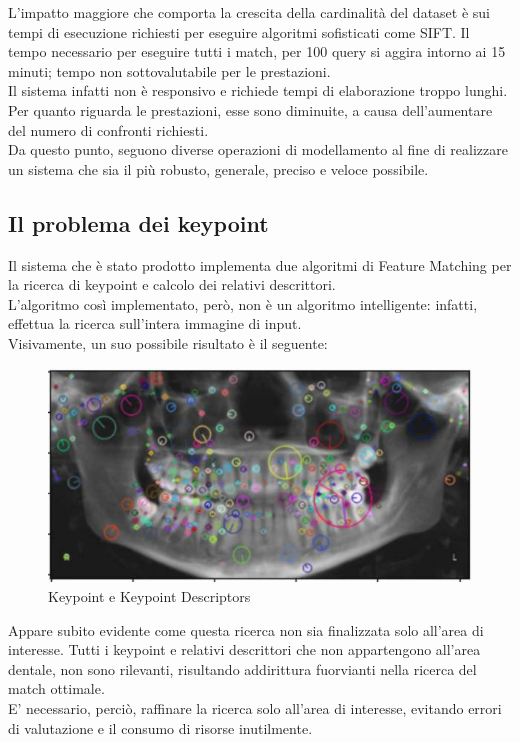 \documentclass[12pt,a4paper,openright,twoside]{book}
\begin{document}
L'impatto maggiore che comporta la crescita della cardinalità del dataset è sui tempi di esecuzione richiesti per eseguire algoritmi sofisticati come SIFT. Il tempo necessario per eseguire tutti i match, per 100 query si aggira intorno ai 15 minuti; tempo non sottovalutabile per  le prestazioni.\\
Il sistema infatti non è responsivo e richiede tempi di elaborazione troppo lunghi.\\

Per quanto riguarda le prestazioni, esse sono diminuite,  a causa dell'aumentare del numero di confronti richiesti.\\
Da questo punto, seguono diverse operazioni di modellamento al fine di realizzare un sistema che sia il più robusto, generale, preciso e veloce possibile.



\subsection{Il problema dei keypoint}
Il sistema che è stato prodotto implementa due algoritmi di Feature Matching per la ricerca di keypoint e calcolo dei relativi descrittori. \\
L'algoritmo così implementato, però, non è un algoritmo intelligente: infatti, effettua la ricerca sull'intera immagine di input.\\

Visivamente, un suo possibile risultato è il seguente:
\begin{figure}[H]
	\centering
	\includegraphics[width=14cm]{figures/keypointall.pdf}
    	\caption{Keypoint e Keypoint Descriptors}
	\label{fig:keypointall}
\end{figure}

Appare subito evidente come questa ricerca non sia finalizzata solo all'area di interesse. Tutti i keypoint e relativi descrittori che non appartengono all'area dentale, non sono rilevanti, risultando addirittura fuorvianti nella ricerca del match ottimale.\\
E' necessario, perciò, raffinare la ricerca solo all'area di interesse, evitando errori di valutazione e il consumo di risorse inutilmente.
\end{document}
